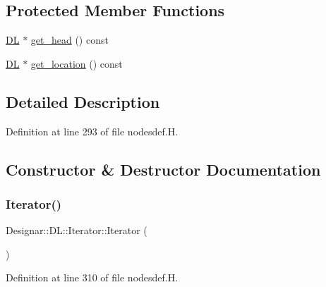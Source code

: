 \subsection*{Protected Member Functions}
\begin{DoxyCompactItemize}
\item 
\hyperlink{class_designar_1_1_d_l}{DL} $\ast$ \hyperlink{class_designar_1_1_d_l_1_1_iterator_a575d5bbd0ce2e3d5df42d5d0112a1063}{get\+\_\+head} () const
\item 
\hyperlink{class_designar_1_1_d_l}{DL} $\ast$ \hyperlink{class_designar_1_1_d_l_1_1_iterator_af9d1225d5fa038ec4868e0910d4b9da0}{get\+\_\+location} () const
\end{DoxyCompactItemize}


\subsection{Detailed Description}


Definition at line 293 of file nodesdef.\+H.



\subsection{Constructor \& Destructor Documentation}
\mbox{\label{class_designar_1_1_d_l_1_1_iterator_ac8115296dde1a00604510beba6707b36}} 
\subsubsection{\texorpdfstring{Iterator()}{Iterator()}\hspace{0.1cm}{\footnotesize\ttfamily [1/5]}}
{\footnotesize\ttfamily Designar\+::\+D\+L\+::\+Iterator\+::\+Iterator (\begin{DoxyParamCaption}{ }\end{DoxyParamCaption})\hspace{0.3cm}{\ttfamily [inline]}}



Definition at line 310 of file nodesdef.\+H.

\mbox{\label{class_designar_1_1_d_l_1_1_iterator_ab40eab4206926dca72f7981c4920c984}} 
